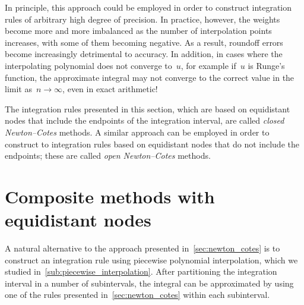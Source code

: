 In principle,
this approach could be employed in order to construct integration rules of arbitrary high degree of precision.
In practice, however, the weights become more and more imbalanced as the number of interpolation points increases,
with some of them becoming negative.
As a result, roundoff errors become increasingly detrimental to accuracy.
In addition, in cases where the interpolating polynomial does not converge to~$u$,
for example if~$u$ is Runge's function,
the approximate integral may not converge to the correct value in the limit as~$n \to \infty$,
even in exact arithmetic!

The integration rules presented in this section,
which are based on equidistant nodes that include the endpoints of the integration interval,
are called \emph{closed Newton--Cotes} methods.
A similar approach can be employed in order to construct to integration rules based on equidistant nodes that do not include the endpoints;
these are called \emph{open Newton--Cotes} methods.
\section{Composite methods with equidistant nodes}
\label{sec:composite_methods}
A natural alternative to the approach presented in~\cref{sec:newton_cotes}
is to construct an integration rule using piecewise polynomial interpolation,
which we studied in~\cref{sub:piecewise_interpolation}.
After partitioning the integration interval in a number of subintervals,
the integral can be approximated by using one of the rules presented in~\eqref{sec:newton_cotes} within each subinterval.

